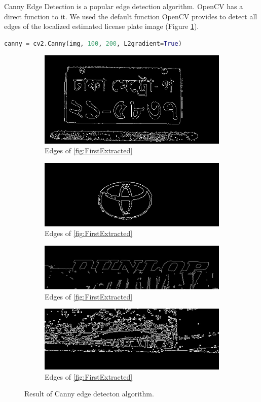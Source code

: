 \documentclass{standalone}
\begin{document}
Canny Edge Detection is a popular edge detection algorithm. OpenCV has a direct function to it. We used the default function OpenCV provides to detect all edges of the localized estimated license plate image (Figure \ref{fig:CannyEdges}). 
\begin{lstlisting}[language=Python]
canny = cv2.Canny(img, 100, 200, L2gradient=True)
\end{lstlisting}

\begin{figure}
\begin{subfigure}{.5\textwidth}
  \centering
  \includegraphics[width=.8\linewidth]{./img/sample/stage8-1.jpg}
  \caption{Edges of \ref{fig:FirstExtracted}}
\end{subfigure}
\begin{subfigure}{.5\textwidth}
  \centering
  \includegraphics[width=.8\linewidth]{./img/sample/stage8-2.jpg}
  \caption{Edges of \ref{fig:FirstExtracted}}
\end{subfigure}
\begin{subfigure}{.5\textwidth}
  \centering
  \includegraphics[width=.8\linewidth]{./img/sample/stage8-3.jpg}
  \caption{Edges of \ref{fig:FirstExtracted}}
\end{subfigure}
\begin{subfigure}{.5\textwidth}
  \centering
  \includegraphics[width=.8\linewidth]{./img/sample/stage8-4.jpg}
  \caption{Edges of \ref{fig:FirstExtracted}}
\end{subfigure}
\caption{Result of Canny edge detecton algorithm.}
\label{fig:CannyEdges}
\end{figure}
\end{document}
